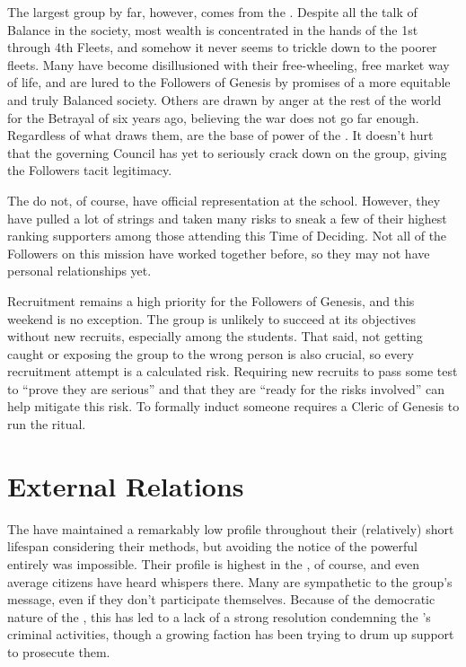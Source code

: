 \documentclass[blue]{GL2020}
\begin{document}
The largest group by far, however, comes from the \pShip{}. Despite all the talk of Balance in the \pShip{} society, most wealth is concentrated in the hands of the 1st through 4th Fleets, and somehow it never seems to trickle down to the poorer fleets. Many \pShippies{} have become disillusioned with their free-wheeling, free market way of life, and are lured to the Followers of Genesis by promises of a more equitable and truly Balanced society. Others are drawn by anger at the rest of the world for the Betrayal of six years ago, believing the war does not go far enough. Regardless of what draws them, \pShippies{} are the base of power of the \pGoaties{}. It doesn't hurt that the governing Council has yet to seriously crack down on the group, giving the Followers tacit legitimacy.

The \pGoaties{} do not, of course, have official representation at the school. However, they have pulled a lot of strings and taken many risks to sneak a few of their highest ranking supporters among those attending this Time of Deciding. Not all of the Followers on this mission have worked together before, so they may not have personal relationships yet.

Recruitment remains a high priority for the Followers of Genesis, and this weekend is no exception. The group is unlikely to succeed at its objectives without new recruits, especially among the students. That said, not getting caught or exposing the group to the wrong person is also crucial, so every recruitment attempt is a calculated risk. Requiring new recruits to pass some test to ``prove they are serious'' and that they are ``ready for the risks involved'' can help mitigate this risk. To formally induct someone requires a Cleric of Genesis to run the ritual.

\section*{External Relations}
The \pGoaties{} have maintained a remarkably low profile throughout their (relatively) short lifespan considering their methods, but avoiding the notice of the powerful entirely was impossible. Their profile is highest in the \pShip{}, of course, and even average citizens have heard whispers there. Many \pShippies{} are sympathetic to the group's message, even if they don't participate themselves. Because of the democratic nature of the \pShip{}, this has led to a lack of a strong resolution condemning the \pGoaties{}'s criminal activities, though a growing faction has been trying to drum up support to prosecute them.
\end{document}
